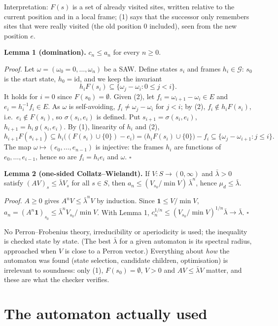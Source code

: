 \documentclass[11pt,a4paper]{report}
\begin{document}
Interpretation: \(F(s)\) is a set of already visited sites, written relative to the current position and in a
local frame; (1) says that the successor only remembers sites that were really visited (the old position \(0\)
included), seen from the new position \(e\).

\textbf{Lemma 1 (domination).} \(c_n\le a_n\) for every \(n\ge0\).

\emph{Proof.} Let \(\omega=(\omega_0=0,\dots,\omega_n)\) be a SAW. Define states \(s_i\) and frames \(h_i\in\mathcal G\):
\(s_0\) is the start state, \(h_0=\mathrm{id}\), and we keep the invariant
\[h_i F(s_i)\subseteq\{\omega_j-\omega_i: 0\le j<i\}. \tag{2}\]
It holds for \(i=0\) since \(F(s_0)=\emptyset\). Given (2), let \(f_i=\omega_{i+1}-\omega_i\in E\) and
\(e_i=h_i^{-1}f_i\in E\). As \(\omega\) is self-avoiding, \(f_i\ne\omega_j-\omega_i\) for \(j<i\); by (2),
\(f_i\notin h_iF(s_i)\), i.e.~\(e_i\notin F(s_i)\), so \(\sigma(s_i,e_i)\) is defined. Put
\(s_{i+1}=\sigma(s_i,e_i)\), \(h_{i+1}=h_i\,g(s_i,e_i)\). By (1), linearity of \(h_i\) and (2),
\[h_{i+1}F(s_{i+1})\subseteq h_i\bigl((F(s_i)\cup\{0\})-e_i\bigr)=\bigl(h_iF(s_i)\cup\{0\}\bigr)-f_i
\subseteq\{\omega_j-\omega_{i+1}:j\le i\}.\]
The map \(\omega\mapsto(e_0,\dots,e_{n-1})\) is injective: the frames \(h_i\) are functions of
\(e_0,\dots,e_{i-1}\), hence so are \(f_i=h_ie_i\) and \(\omega\). \(\square\)

\textbf{Lemma 2 (one-sided Collatz--Wielandt).} If \(V:S\to(0,\infty)\) and \(\bar\lambda>0\) satisfy
\((AV)_s\le\bar\lambda V_s\) for all \(s\in S\), then \(a_n\le (V_{s_0}/\min V)\,\bar\lambda^n\), hence
\(\mu_d\le\bar\lambda\).

\emph{Proof.} \(A\ge0\) gives \(A^nV\le\bar\lambda^nV\) by induction. Since \(\mathbf 1\le V/\min V\),
\(a_n=(A^n\mathbf 1)_{s_0}\le\bar\lambda^nV_{s_0}/\min V\). With Lemma 1,
\(c_n^{1/n}\le(V_{s_0}/\min V)^{1/n}\bar\lambda\to\bar\lambda\). \(\square\)

No Perron--Frobenius theory, irreducibility or aperiodicity is used; the inequality is checked state by state. (The
best \(\bar\lambda\) for a given automaton is its spectral radius, approached when \(V\) is close to a Perron
vector.) Everything about \emph{how} the automaton was found (state selection, candidate children, optimisation) is
irrelevant to soundness: only (1), \(F(s_0)=\emptyset\), \(V>0\) and \(AV\le\bar\lambda V\) matter, and these are
what the checker verifies.

\section{The automaton actually used}
\end{document}
